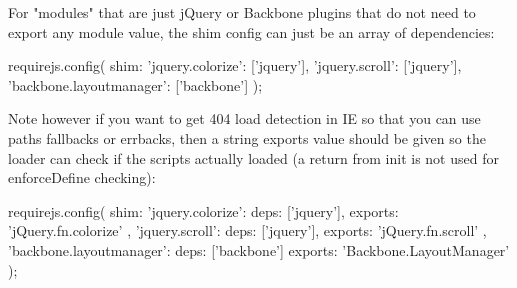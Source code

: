 For "modules" that are just jQuery or Backbone plugins that do not need to export any module value, the shim config can just be an array of dependencies:

\begin{JavaScript}
requirejs.config({
    shim: {
        'jquery.colorize': ['jquery'],
        'jquery.scroll': ['jquery'],
        'backbone.layoutmanager': ['backbone']
    }
});
\end{JavaScript}

Note however if you want to get 404 load detection in IE so that you can use paths fallbacks or errbacks, then a string exports value should be given so the loader can check if the scripts actually loaded (a return from init is not used for enforceDefine checking):

\begin{JavaScript}
requirejs.config({
    shim: {
        'jquery.colorize': {
            deps: ['jquery'],
            exports: 'jQuery.fn.colorize'
        },
        'jquery.scroll': {
            deps: ['jquery'],
            exports: 'jQuery.fn.scroll'
        },
        'backbone.layoutmanager': {
            deps: ['backbone']
            exports: 'Backbone.LayoutManager'
        }
    }
});
\end{JavaScript}


